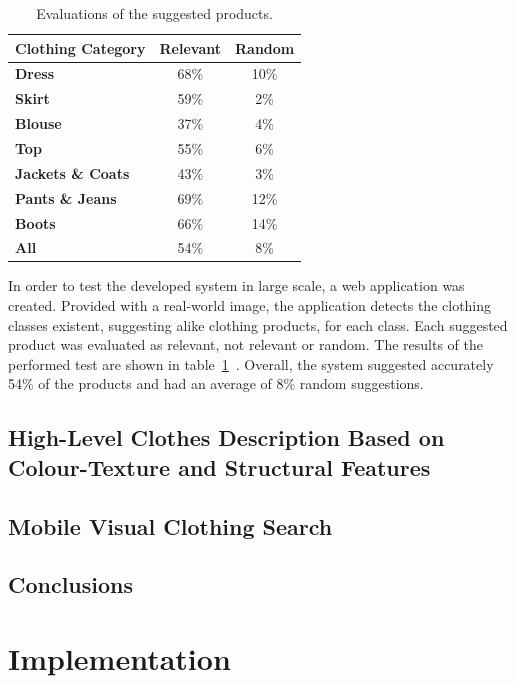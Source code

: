 \documentclass[titlepage,12pt,a4paper,times]{book}
\begin{document}
\begin{table}
\centering
\begin{tabular}{|l|c|c|}
\hline
\textbf{Clothing Category} & \textbf{Relevant} & \textbf{Random}\\
\hline
\hline
\textbf{Dress} & 68\% & 10\% \\
\hline
\textbf{Skirt} & 59\% & 2\% \\
\hline
\textbf{Blouse} & 37\% & 4\% \\
\hline
\textbf{Top} & 55\% & 6\% \\
\hline
\textbf{Jackets \& Coats} & 43\% & 3\% \\
\hline
\textbf{Pants \& Jeans} & 69\% & 12\% \\
\hline
\textbf{Boots} & 66\% & 14\% \\
\hline
\hline
\textbf{All} & 54\% & 8\% \\
\hline
\end{tabular}
\caption{Evaluations of the suggested products.}
\label{tab:uesp}
\end{table}
\FloatBarrier

In order to test the developed system in large scale, a web application was
created. Provided with a real-world image, the application detects the clothing
classes existent, suggesting alike clothing products, for each class. Each
suggested product was evaluated as relevant, not relevant or random. The
results of the performed test are shown in table~\ref{tab:uesp}~\citep{3}.
Overall, the system suggested accurately 54\% of the products and had an
average of 8\% random suggestions.

\section{High-Level Clothes Description Based on Colour-Texture and Structural
Features}
\label{chap2:sec:art4}

\section{Mobile Visual Clothing Search}
\label{chap2:sec:art5}

\section{Conclusions}
\label{chap2:sec:concs}

\chapter{Implementation}
\label{chap:imp}
\end{document}
